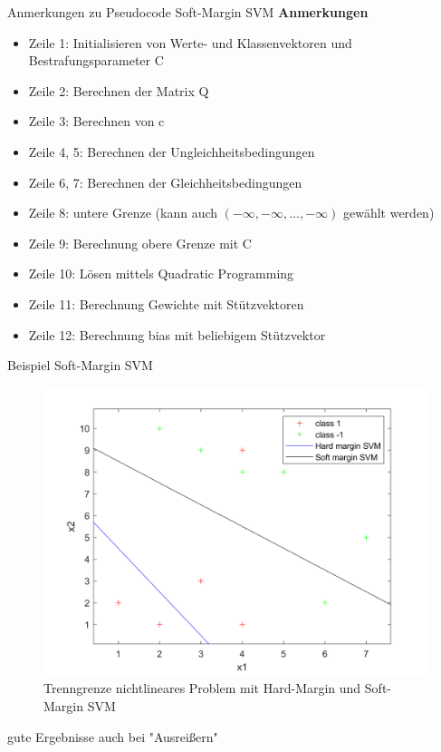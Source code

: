 \documentclass[ngerman]{beamer}
\begin{document}
\begin{frame}{Anmerkungen zu Pseudocode Soft-Margin SVM}
    \textbf{Anmerkungen} \\
    \begin{itemize}
        \item Zeile 1: Initialisieren von Werte- und Klassenvektoren und Bestrafungsparameter C
        \item Zeile 2: Berechnen der Matrix Q
        \item Zeile 3: Berechnen von c
        \item Zeile 4, 5: Berechnen der Ungleichheitsbedingungen
        \item Zeile 6, 7: Berechnen der Gleichheitsbedingungen
        \item Zeile 8: untere Grenze (kann auch $\left( -\infty, -\infty, \ldots, -\infty \right)$ gewählt werden)
        \item Zeile 9: Berechnung obere Grenze mit C
        \item Zeile 10: Lösen mittels Quadratic Programming
        \item Zeile 11: Berechnung Gewichte mit Stützvektoren
        \item Zeile 12: Berechnung bias mit beliebigem Stützvektor
    \end{itemize}
\end{frame}

\begin{frame}{Beispiel Soft-Margin SVM}
    \begin{center}
        \begin{figure}
            \includegraphics[width=\textwidth,height=0.7\textheight,keepaspectratio]{../code/octave/images/svmsimplenotlinear}
            \caption{Trenngrenze nichtlineares Problem mit Hard-Margin und Soft-Margin SVM}
            \label{fig:bspsmsvm}
        \end{figure}
    \end{center} \pause
    gute Ergebnisse auch bei "Ausreißern"
\end{frame}
\end{document}
